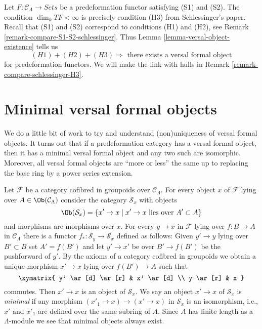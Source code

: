 \begin{remark}
\label{remark-compare-schlessinger-H3-pre}
Let $F : \mathcal{C}_\Lambda \to \textit{Sets}$ be a predeformation functor
satisfying (S1) and (S2). The condition $\dim_k TF < \infty$
is precisely condition (H3) from Schlessinger's paper.
Recall that (S1) and (S2) correspond to conditions (H1) and (H2), see
Remark \ref{remark-compare-S1-S2-schlessinger}.
Thus Lemma \ref{lemma-versal-object-existence} tells us
$$
(H1) + (H2) + (H3)
\Rightarrow
\text{ there exists a versal formal object}
$$
for predeformation functors. We will make the link with hulls in
Remark \ref{remark-compare-schlessinger-H3}.
\end{remark}





\section{Minimal versal formal objects}
\label{section-minimal-versal}

\noindent
We do a little bit of work to try and understand (non)uniqueness
of versal formal objects. It turns out that if a predeformation category
has a versal formal object, then it has a minimal versal formal
object and any two such are isomorphic. Moreover, all versal formal
objects are ``more or less'' the same up to replacing the base ring
by a power series extension.

\medskip\noindent
Let $\mathcal{F}$ be a category cofibred in groupoids over
$\mathcal{C}_\Lambda$. For every object $x$ of $\mathcal{F}$
lying over $A \in \Ob(\mathcal{C}_\Lambda)$ consider the
category $\mathcal{S}_x$ with objects
$$
\Ob(\mathcal{S}_x) =
\{x' \to x \mid x' \to x\text{ lies over }A' \subset A\}
$$
and morphisms are morphisms over $x$. For every $y \to x$ in
$\mathcal{F}$ lying over $f : B \to A$
in $\mathcal{C}_\Lambda$ there is a functor
$f_* : \mathcal{S}_y \to \mathcal{S}_x$ defined as follows:
Given $y' \to y$ lying over $B' \subset B$ set $A' = f(B')$
and let $y' \to x'$ be over $B' \to f(B')$ be the pushforward of $y'$.
By the axioms of a category cofibred in groupoids we obtain a
unique morphism $x' \to x$ lying over $f(B') \to A$ such that
$$
\xymatrix{
y' \ar[d] \ar[r] & x' \ar[d] \\
y \ar[r] & x
}
$$
commutes. Then $x' \to x$ is an object of $\mathcal{S}_x$. We say an
object $x' \to x$ of $\mathcal{S}_x$ is {\it minimal} if any morphism
$(x'_1 \to x) \to (x' \to x)$ in $\mathcal{S}_x$ is an isomorphism, i.e.,
$x'$ and $x'_1$ are defined over the same subring of $A$. Since
$A$ has finite length as a $\Lambda$-module we see that minimal objects
always exist.

